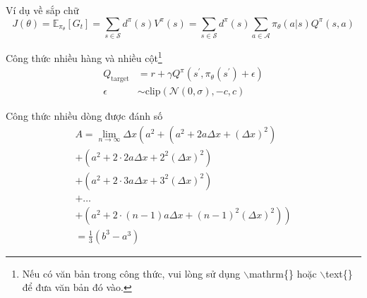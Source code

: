 \documentclass{beamer}
\begin{document}
\begin{frame}{Ví dụ về sắp chữ}  %
	\text{\textcolor{purple}{Công thức không đánh số}}
        $$J(\theta)=\mathbb{E}_{\pi_\theta}[G_t]=\sum_{s\in\mathcal{S}}d^\pi(s)V^\pi(s)=\sum_{s\in\mathcal{S}}d^\pi(s)\sum_{a\in\mathcal{A}}\pi_\theta(a|s)Q^\pi(s,a)$$
   
    \begin{exampleblock}{Công thức nhiều hàng và nhiều cột\footnote{Nếu có văn bản trong công thức, vui lòng sử dụng $\backslash$mathrm\{\} hoặc $\backslash$text\{\} để đưa văn bản đó vào.}}
        \begin{align}
            Q_\mathrm{target}&=r+\gamma Q^\pi(s^\prime, \pi_\theta(s^\prime)+\epsilon)\\
            \epsilon&\sim\mathrm{clip}(\mathcal{N}(0, \sigma), -c, c)\nonumber
        \end{align}
    \end{exampleblock}
\end{frame}

\begin{frame}
    \begin{exampleblock}{Công thức nhiều dòng được đánh số}  %
        \begin{multline}
            A=\lim_{n\rightarrow\infty}\Delta x\left(a^{2}+\left(a^{2}+2a\Delta x+\left(\Delta x\right)^{2}\right)\right.\label{eq:reset}\\
            +\left(a^{2}+2\cdot2a\Delta x+2^{2}\left(\Delta x\right)^{2}\right)\\
            +\left(a^{2}+2\cdot3a\Delta x+3^{2}\left(\Delta x\right)^{2}\right)\\
            +\ldots\\
            \left.+\left(a^{2}+2\cdot(n-1)a\Delta x+(n-1)^{2}\left(\Delta x\right)^{2}\right)\right)\\
            =\frac{1}{3}\left(b^{3}-a^{3}\right)
        \end{multline}
    \end{exampleblock}
\end{frame}
\end{document}
